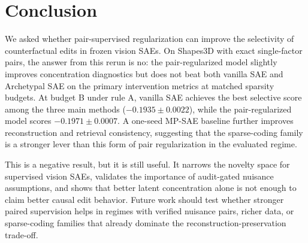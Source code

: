 \section{Conclusion}

We asked whether pair-supervised regularization can improve the selectivity of counterfactual edits in frozen vision SAEs. On Shapes3D with exact single-factor pairs, the answer from this rerun is no: the pair-regularized model slightly improves concentration diagnostics but does not beat both vanilla SAE and Archetypal SAE on the primary intervention metrics at matched sparsity budgets. At budget B under rule A, vanilla SAE achieves the best selective score among the three main methods ($-0.1935 \pm 0.0022$), while the pair-regularized model scores $-0.1971 \pm 0.0007$. A one-seed MP-SAE baseline further improves reconstruction and retrieval consistency, suggesting that the sparse-coding family is a stronger lever than this form of pair regularization in the evaluated regime.

This is a negative result, but it is still useful. It narrows the novelty space for supervised vision SAEs, validates the importance of audit-gated nuisance assumptions, and shows that better latent concentration alone is not enough to claim better causal edit behavior. Future work should test whether stronger paired supervision helps in regimes with verified nuisance pairs, richer data, or sparse-coding families that already dominate the reconstruction-preservation trade-off.





